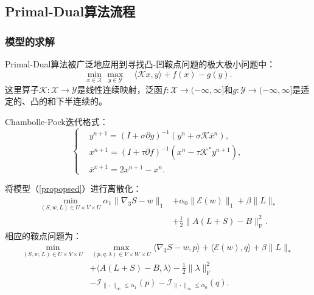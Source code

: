 \documentclass{beamer}
\begin{document}
\subsection{Primal-Dual算法流程}
\begin{frame}
\frametitle{模型的求解}
Primal-Dual算法被广泛地应用到寻找凸-凹鞍点问题的极大极小问题中：
\begin{equation}
\min_{x\in\mathcal{X}}\max_{y\in\mathcal{Y}}\quad\langle \mathcal{K}x,y\rangle+f(x)-g(y).
\label{saddle}
\end{equation}
这里算子$\mathcal{K}:\mathcal{X}\rightarrow\mathcal{Y}$是线性连续映射，泛函$f:\mathcal{X}\rightarrow(-\infty,\infty]$和$g:\mathcal{Y}\rightarrow(-\infty,\infty]$是适定的、凸的和下半连续的。

\vspace{0.5cm}
Chambolle-Pock迭代格式：
\begin{equation*}
\left\{
\begin{aligned}
&y^{n+1}=(I+\sigma\partial g)^{-1}(y^n+\sigma \mathcal{K}\bar{x}^n), \\
&x^{n+1}=(I+\tau\partial f)^{-1}(x^n-\tau \mathcal{K}^*y^{n+1}), \\
&\bar{x}^{x+1}=2x^{n+1}-x^n.
\end{aligned}
\right.
\end{equation*}
\end{frame}

\begin{frame}
将模型（\ref{propopsed}）进行离散化：
\begin{equation}
\begin{aligned}
	\min_{(S,w,L)\in U\times V\times U} \alpha_1 \|\nabla_3 S-w\|_1&+\alpha_0\|\mathcal{E}(w)\|_1+\beta\|L\|_*\\
	&+\frac{1}{2}\|A(L+S)-B\|_\mathrm{F}^2.
\end{aligned}
\label{discrete}
\end{equation}
相应的鞍点问题为：
\begin{equation}
\begin{aligned}
	\min_{(S,w,L)\in U\times V\times U} &\max_{(p,q,\lambda)\in V\times W\times U} \langle \nabla_3 S-w,p\rangle+\langle\mathcal{E}(w),q\rangle+\beta\|L\|_* \\
	&+\langle A(L+S)-B,\lambda \rangle-\frac{1}{2}\|\lambda\|_\mathrm{F}^2 \\
	&-\mathcal{I}_{\|\cdot\|_\infty\leq\alpha_1}(p)-\mathcal{I}_{\|\cdot\|_\infty\leq\alpha_0}(q).
\end{aligned}
\label{dual}
\end{equation}
\end{frame}
\end{document}

